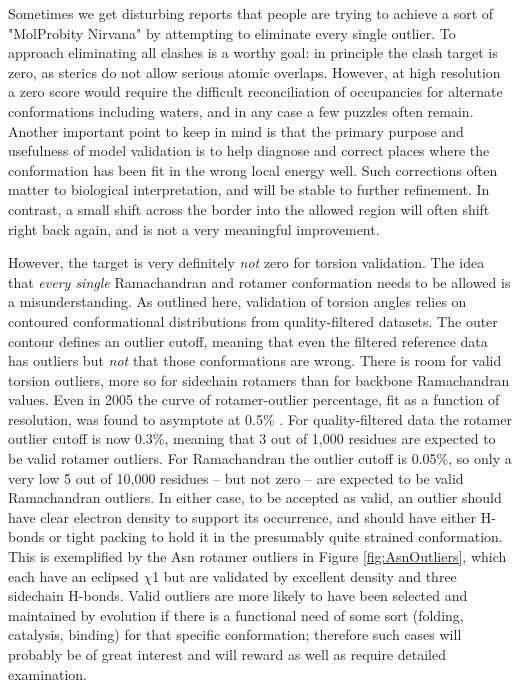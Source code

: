 Sometimes we get disturbing reports that people are trying to achieve a sort of "MolProbity Nirvana" by attempting to eliminate every single outlier. To approach eliminating all clashes is a worthy goal: in principle the clash target is zero, as sterics do not allow serious atomic overlaps. However, at high resolution a zero score would require the difficult reconciliation of occupancies for alternate conformations including waters, and in any case a few puzzles often remain. Another important point to keep in mind is that the primary purpose and usefulness of model validation is to help diagnose and correct places where the conformation has been fit in the wrong local energy well. Such corrections often matter to biological interpretation, and will be stable to further refinement. In contrast, a small shift across the border into the allowed region will often shift right back again, and is not a very meaningful improvement.

However, the target is very definitely \textit{not} zero for torsion validation. The idea that \textit{every single} Ramachandran and rotamer conformation needs to be allowed is a misunderstanding. As outlined here, validation of torsion angles relies on contoured conformational distributions from quality-filtered datasets. The outer contour defines an outlier cutoff, meaning that even the filtered reference data has outliers but \textit{not} that those conformations are wrong. There is room for valid torsion outliers, more so for sidechain rotamers than for backbone Ramachandran values. Even in 2005 the curve of rotamer-outlier percentage, fit as a function of resolution, was found to asymptote at 0.5\% \cite{Arendall2005}. For quality-filtered data the rotamer outlier cutoff is now 0.3\%, meaning that 3 out of 1,000 residues are expected to be valid rotamer outliers. For Ramachandran the outlier cutoff is 0.05\%, so only a very low 5 out of 10,000 residues -- but not zero -- are expected to be valid Ramachandran outliers. In either case, to be accepted as valid, an outlier should have clear electron density to support its occurrence, and should have either H-bonds or tight packing to hold it in the presumably quite strained conformation. This is exemplified by the Asn rotamer outliers in Figure \ref{fig:AsnOutliers}, which each have an eclipsed $\chi$1 but are validated by excellent density and three sidechain H-bonds.  Valid outliers are more likely to have been selected and maintained by evolution if there is a functional need of some sort (folding, catalysis, binding) for that specific conformation; therefore such cases will probably be of great interest and will reward as well as require detailed examination.
